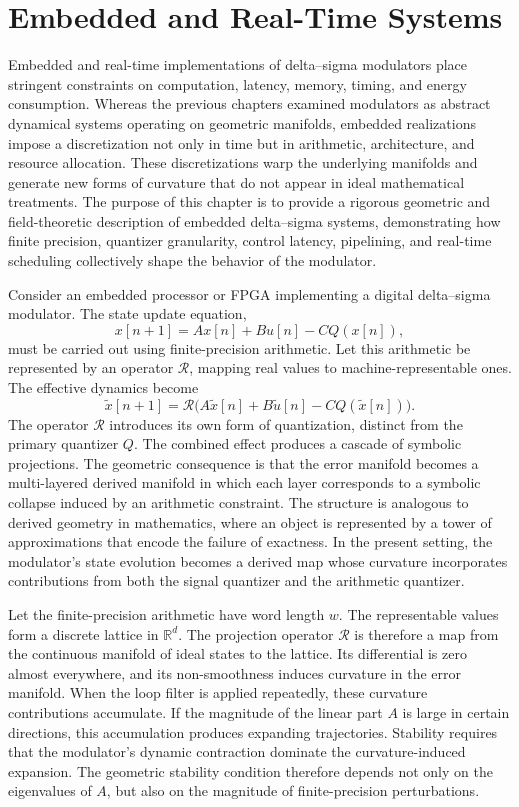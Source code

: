 
\chapter{Embedded and Real-Time Systems}

Embedded and real-time implementations of delta–sigma modulators place stringent constraints on computation, latency, memory, timing, and energy consumption. Whereas the previous chapters examined modulators as abstract dynamical systems operating on geometric manifolds, embedded realizations impose a discretization not only in time but in arithmetic, architecture, and resource allocation. These discretizations warp the underlying manifolds and generate new forms of curvature that do not appear in ideal mathematical treatments. The purpose of this chapter is to provide a rigorous geometric and field-theoretic description of embedded delta–sigma systems, demonstrating how finite precision, quantizer granularity, control latency, pipelining, and real-time scheduling collectively shape the behavior of the modulator.

Consider an embedded processor or FPGA implementing a digital delta–sigma modulator. The state update equation,
\[
x[n+1] = A x[n] + B u[n] - C Q(x[n]),
\]
must be carried out using finite-precision arithmetic. Let this arithmetic be represented by an operator \( \mathcal{R} \), mapping real values to machine-representable ones. The effective dynamics become
\[
\tilde{x}[n+1] = \mathcal{R}\bigl( A \tilde{x}[n] + B \tilde{u}[n] - C Q(\tilde{x}[n]) \bigr).
\]
The operator \( \mathcal{R} \) introduces its own form of quantization, distinct from the primary quantizer \(Q\). The combined effect produces a cascade of symbolic projections. The geometric consequence is that the error manifold becomes a multi-layered derived manifold in which each layer corresponds to a symbolic collapse induced by an arithmetic constraint. The structure is analogous to derived geometry in mathematics, where an object is represented by a tower of approximations that encode the failure of exactness. In the present setting, the modulator’s state evolution becomes a derived map whose curvature incorporates contributions from both the signal quantizer and the arithmetic quantizer.

Let the finite-precision arithmetic have word length \(w\). The representable values form a discrete lattice in \(\mathbb{R}^d\). The projection operator \( \mathcal{R} \) is therefore a map from the continuous manifold of ideal states to the lattice. Its differential is zero almost everywhere, and its non-smoothness induces curvature in the error manifold. When the loop filter is applied repeatedly, these curvature contributions accumulate. If the magnitude of the linear part \(A\) is large in certain directions, this accumulation produces expanding trajectories. Stability requires that the modulator’s dynamic contraction dominate the curvature-induced expansion. The geometric stability condition therefore depends not only on the eigenvalues of \(A\), but also on the magnitude of finite-precision perturbations.

